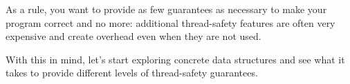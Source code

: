 As a rule, you want to provide as few guarantees as necessary to make your program correct and no more: additional thread-safety features are often very expensive and create overhead even when they are not used.

With this in mind, let's start exploring concrete data structures and see what it takes to provide different levels of thread-safety guarantees.

































